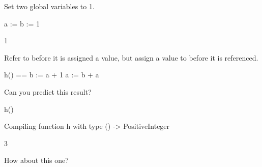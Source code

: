 \begin{xtc}
\begin{xtccomment}
Set two global variables to 1.
\end{xtccomment}
\begin{spadsrc}
a := b := 1
\end{spadsrc}
\begin{TeXOutput}
\begin{fricasmath}{8}
1%
\end{fricasmath}
\end{TeXOutput}
\end{xtc}
\begin{xtc}
\begin{xtccomment}
Refer to  before it is assigned a value, but
assign a value to  before it is referenced.
\end{xtccomment}
\begin{spadsrc}
h() ==
  b := a + 1
  a := b + a
\end{spadsrc}
\end{xtc}
\begin{xtc}
\begin{xtccomment}
Can you predict this result?
\end{xtccomment}
\begin{spadsrc}
h() 
\end{spadsrc}
\begin{MessageOutput}
   Compiling function h with type () -> PositiveInteger 
\end{MessageOutput}
\begin{TeXOutput}
\begin{fricasmath}{10}
3%
\end{fricasmath}
\end{TeXOutput}
\end{xtc}
\begin{xtc}
\begin{xtccomment}
How about this one?
\end{xtccomment}
\begin{spadsrc}
[a, b] 
\end{spadsrc}
\begin{TeXOutput}
\begin{fricasmath}{11}
%
\end{fricasmath}
\end{TeXOutput}
\end{xtc}

